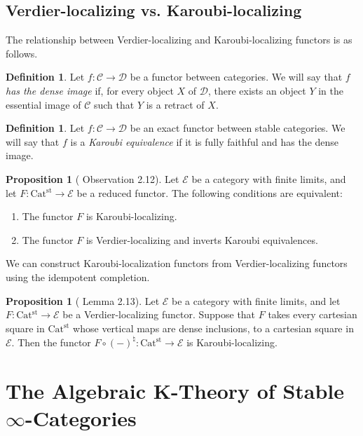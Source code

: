 \documentclass[a4paper,dvipdfmx,11pt,reqno]{amsart}
\newcommand{\C}{\mathcal{C}}
\newcommand{\D}{\mathcal{D}}
\newcommand{\E}{\mathcal{E}}
\newcommand{\Catst}{\mathrm{Cat^{st}}}
\theoremstyle{definition}
\newtheorem{definition}[theorem]{Definition}
\newtheorem{proposition}[theorem]{Proposition}
\begin{document}
\subsection{Verdier-localizing vs. Karoubi-localizing}

The relationship between Verdier-localizing and Karoubi-localizing functors is as follows.

\begin{definition}
  Let $f : \C \to \D$ be a functor between categories.
  We will say that $f$ \textit{has the dense image} if, for every object $X$ of $\D$, there exists an object $Y$ in the essential image of $\C$ such that $Y$ is a retract of $X$. 
\end{definition}

\begin{definition}
  Let $f : \C \to \D$ be an exact functor between stable categories.
  We will say that $f$ is a \textit{Karoubi equivalence} if it is fully faithful and has the dense image.
\end{definition}

\begin{proposition}[\cite{HLS23} Observation 2.12] \label{HLS23.obs.2.12}
  Let $\E$ be a category with finite limits, and let $F : \Catst \to \E$ be a reduced functor.
  The following conditions are equivalent:
  \begin{enumerate}
    \item The functor $F$ is Karoubi-localizing.
    \item The functor $F$ is Verdier-localizing and inverts Karoubi equivalences.
  \end{enumerate}
\end{proposition}

We can construct Karoubi-localization functors from Verdier-localizing functors using the idempotent completion.

\begin{proposition}[\cite{HLS23} Lemma 2.13] \label{HLS23.lem.2.13}
  Let $\E$ be a category with finite limits, and let $F : \Catst \to \E$ be a Verdier-localizing functor.
  Suppose that $F$ takes every cartesian square in $\Catst$ whose vertical maps are dense inclusions, to a cartesian square in $\E$. 
  Then the functor $F \circ (-)^{\natural} : \Catst \to \E$ is Karoubi-localizing.
\end{proposition}


\section{The Algebraic K-Theory of Stable \texorpdfstring{$\infty$}{infty}-Categories} \label{sec.algebraic_k_theory}
\end{document}
